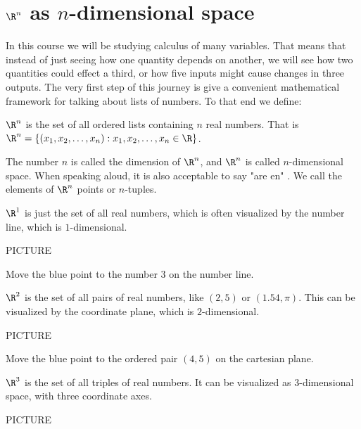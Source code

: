 
\section{$\R^n$ as $n$-dimensional space}

In this course we will be studying calculus of many variables.  That means that instead of just seeing how one quantity depends on another, we will see
how two quantities could effect a third, or how five inputs might cause changes in three outputs.  The very first step of this journey is give a convenient mathematical 
framework for talking about lists of numbers.  To that end we define:

\begin{definition}
  $\R^n$ is the set of all ordered lists containing $n$ real numbers.  That is $\R^n = \{ (x_1,x_2,\dots, x_n) : x_1,x_2,\dots, x_n \in \R \}$.
\end{definition}

The number $n$ is called the dimension of $\R^n$, and $\R^n$ is called $n$-dimensional space.  When speaking aloud, it is also acceptable to say "are en" .
 We call the elements of $\R^n$ points or $n$-tuples.

\begin{example}
	$\R^1$ is just the set of all real numbers, which is often visualized by the number line, which is $1$-dimensional.
	
	PICTURE
\end{example}

\begin{question}
Move the blue point to the number $3$ on the number line.
\end{question}


\begin{example}
	$\R^2$ is the set of all pairs of real numbers, like $(2,5)$ or $(1.54,\pi)$. This can be visualized by the coordinate plane, which is $2$-dimensional.
	
	PICTURE
	
\end{example}

\begin{question}
Move the blue point to the ordered pair $(4,5)$ on the cartesian plane.
\end{question}

\begin{example}
	$\R^3$ is the set of all triples of real numbers.  It can be visualized as $3$-dimensional space, with three coordinate axes. 
	
	PICTURE
\end{example}


